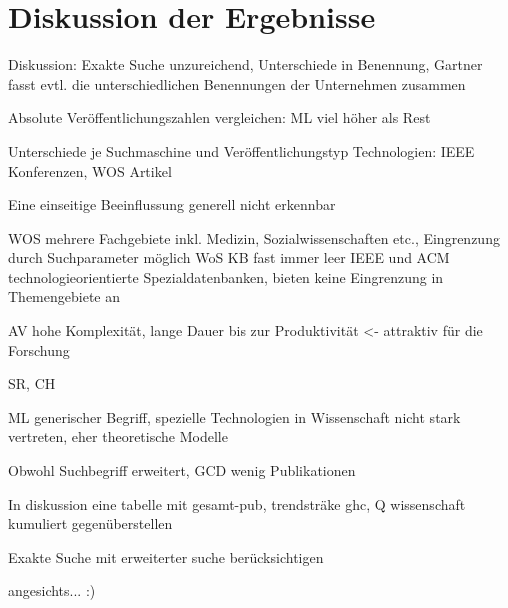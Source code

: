 \section{Diskussion der Ergebnisse}
Diskussion:
Exakte Suche unzureichend, Unterschiede in Benennung, Gartner fasst evtl. die unterschiedlichen Benennungen der Unternehmen zusammen

Absolute Veröffentlichungszahlen vergleichen: ML viel höher als Rest


Unterschiede je Suchmaschine und Veröffentlichungstyp
Technologien: IEEE Konferenzen, WOS Artikel

Eine einseitige Beeinflussung generell nicht erkennbar

WOS mehrere Fachgebiete inkl. Medizin, Sozialwissenschaften etc., Eingrenzung durch Suchparameter möglich
WoS KB fast immer leer
IEEE und ACM technologieorientierte Spezialdatenbanken, bieten keine Eingrenzung in Themengebiete an

AV hohe Komplexität, lange Dauer bis zur Produktivität <- attraktiv für die Forschung

SR, CH

ML generischer Begriff, spezielle Technologien in Wissenschaft nicht stark vertreten, eher theoretische Modelle

Obwohl Suchbegriff erweitert, GCD wenig Publikationen

In diskussion eine tabelle mit gesamt-pub, trendsträke ghc, Q wissenschaft kumuliert gegenüberstellen

Exakte Suche mit erweiterter suche berücksichtigen

angesichts... :)